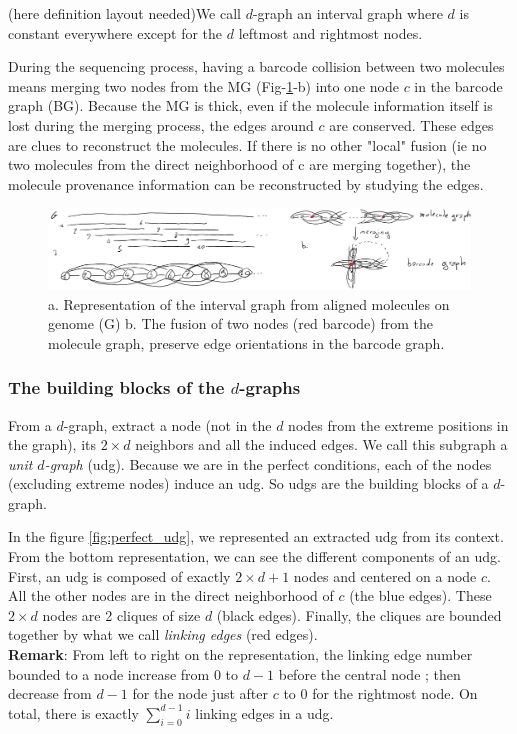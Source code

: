 \documentclass{article}
\begin{document}
(here definition layout needed)We call $d$-graph an interval graph where $d$ is constant everywhere except for the $d$ leftmost and rightmost nodes.

During the sequencing process, having a barcode collision between two molecules means merging two nodes from the MG (Fig-\ref{fig:fusion}-b) into one node $c$ in the barcode graph (BG).
Because the MG is thick, even if the molecule information itself is lost during the merging process, the edges around $c$ are conserved.
These edges are clues to reconstruct the molecules.
If there is no other "local" fusion (ie no two molecules from the direct neighborhood of c are merging together), the molecule provenance information can be reconstructed by studying the edges.

\begin{figure}[htp]
    \centering
    \includegraphics[width=\textwidth]{fusion.pdf}
    \caption{ a. Representation of the interval graph from aligned molecules on genome (G) b. The fusion of two nodes (red barcode) from the molecule graph, preserve edge orientations in the barcode graph. }
    \label{fig:fusion}
\end{figure}


\subsubsection*{The building blocks of the $d$-graphs}

From a $d$-graph, extract a node (not in the $d$ nodes from the extreme positions in the graph), its $2\times d$ neighbors and all the induced edges.
We call this subgraph a \textit{unit $d$-graph} (udg).
Because we are in the perfect conditions, each of the nodes (excluding extreme nodes) induce an udg.
So udgs are the building blocks of a $d$-graph.

In the figure \ref{fig:perfect_udg}, we represented an extracted udg from its context.
From the bottom representation, we can see the different components of an udg.
First, an udg is composed of exactly $2\times d + 1$ nodes and centered on a node $c$.
All the other nodes are in the direct neighborhood of $c$ (the blue edges).
These $2 \times d$ nodes are 2 cliques of size $d$ (black edges).
Finally, the cliques are bounded together by what we call \textit{linking edges} (red edges).\\
\textbf{Remark}: From left to right on the representation, the linking edge number bounded to a node increase from 0 to $d-1$ before the central node ; then decrease from $d-1$ for the node just after $c$ to 0 for the rightmost node.
On total, there is exactly $\sum_{i=0}^{d-1}i$ linking edges in a udg.\\
\end{document}
